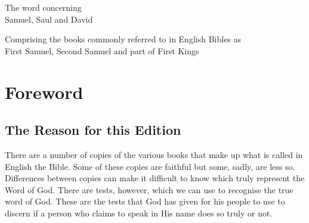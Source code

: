 \clearpage
\begin{center}
The word concerning\\
Samuel, Saul and David

Comprising the books commonly referred to in English Bibles as\\
First Samuel, Second Samuel and part of First Kings
\end{center}
{ %
\setlength{\parindent}{1.5em}
\section*{Foreword}
\subsection*{The Reason for this Edition}

There are a number of copies of the various books that make up what is called in English the Bible.
Some of these copies are faithful but some,
sadly, are less so. Differences between copies can make it difficult to know
which truly represent the Word of God. There are tests, however, which
we can use to recognise the true word of God. These are the tests that
God has given for his people to use to discern if a person who claims to
speak in His name does so truly or not.

}
